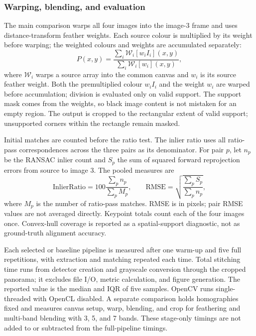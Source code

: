 \documentclass[a4paper,12pt]{article}
\begin{document}
\subsubsection{Warping, blending, and evaluation}
The main comparison warps all four images into the image-3 frame and uses distance-transform feather weights. Each source colour is multiplied by its weight before warping; the weighted colours and weights are accumulated separately:
\begin{equation}
P(x,y)=\frac{\sum_i \mathcal{W}_i[w_i I_i](x,y)}
{\sum_i \mathcal{W}_i[w_i](x,y)},
\end{equation}
where $\mathcal{W}_i$ warps a source array into the common canvas and $w_i$ is its source feather weight. Both the premultiplied colour $w_i I_i$ and the weight $w_i$ are warped before accumulation; division is evaluated only on valid support. The support mask comes from the weights, so black image content is not mistaken for an empty region. The output is cropped to the rectangular extent of valid support; unsupported corners within the rectangle remain masked.

Initial matches are counted before the ratio test. The inlier ratio uses all ratio-pass correspondences across the three pairs as its denominator. For pair $p$, let $n_p$ be the RANSAC inlier count and $S_p$ the sum of squared forward reprojection errors from source to image 3. The pooled measures are
\begin{equation}
\mathrm{InlierRatio}=100\frac{\sum_p n_p}{\sum_p M_p},
\qquad
\mathrm{RMSE}=\sqrt{\frac{\sum_p S_p}{\sum_p n_p}},
\end{equation}
where $M_p$ is the number of ratio-pass matches. RMSE is in pixels; pair RMSE values are not averaged directly. Keypoint totals count each of the four images once. Convex-hull coverage is reported as a spatial-support diagnostic, not as ground-truth alignment accuracy.

Each selected or baseline pipeline is measured after one warm-up and five full repetitions, with extraction and matching repeated each time. Total stitching time runs from detector creation and grayscale conversion through the cropped panorama; it excludes file I/O, metric calculation, and figure generation. The reported value is the median and IQR of five samples. OpenCV runs single-threaded with OpenCL disabled. A separate comparison holds homographies fixed and measures canvas setup, warp, blending, and crop for feathering and multi-band blending with 3, 5, and 7 bands. These stage-only timings are not added to or subtracted from the full-pipeline timings.
\end{document}
